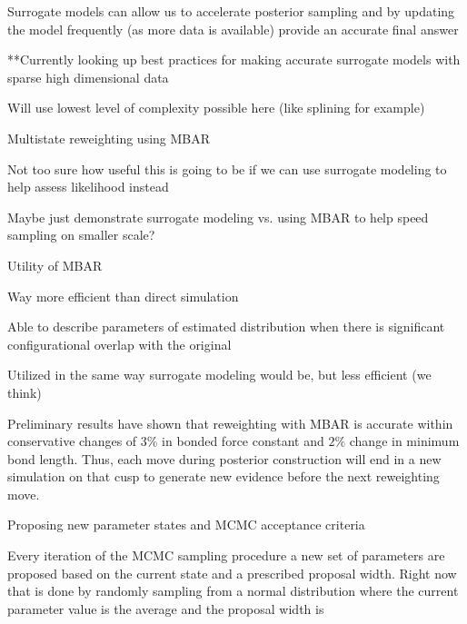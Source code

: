 \documentclass{report}
\begin{document}
\begin{outline}
\begin{outline}
\begin{outline}
\begin{outline}
\begin{outline}
          \item{Surrogate models can allow us to accelerate posterior sampling and by updating the model frequently (as more data is available) provide an 
                  accurate final answer}
          \item{**Currently looking up best practices for making accurate surrogate models with sparse high dimensional data}
          \item{Will use lowest level of complexity possible here (like splining for example)}
        \end{outline}
      \end{outline}
      \item{Multistate reweighting using MBAR}
      \begin{outline}
        \item{Not too sure how useful this is going to be if we can use surrogate modeling to help assess likelihood instead}
        \item{Maybe just demonstrate surrogate modeling vs. using MBAR to help speed sampling on smaller scale?}
        \item{Utility of MBAR}
        \begin{outline}
          \item{Way more efficient than direct simulation}
          \item{Able to describe parameters of estimated distribution when there is significant configurational overlap with the original}
        \end{outline}
        \item{Utilized in the same way surrogate modeling would be, but less efficient (we think)}
        \item{Preliminary results have shown that reweighting with MBAR is accurate within conservative changes of $3\%$ in bonded force constant and $2\%$
                change in minimum bond length. Thus, each move during posterior construction will end in a new simulation on that cusp to generate new 
                evidence before the next reweighting move.}
      \end{outline}
      \item{Proposing new parameter states and MCMC acceptance criteria}
      \begin{outline}
        \item{Every iteration of the MCMC sampling procedure a new set of parameters are proposed based on the current state and a prescribed proposal width.
              Right now that is done by randomly sampling from a normal distribution where the current parameter value is the average and the proposal width is
}
\end{outline}
\end{outline}
\end{outline}
\end{outline}
\end{document}
